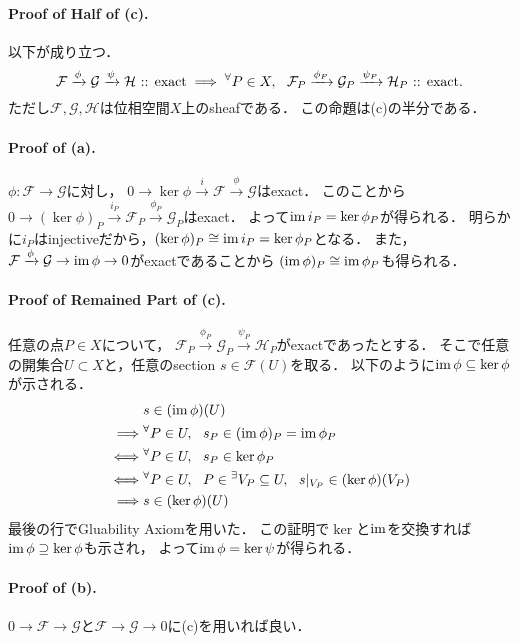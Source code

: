 \documentclass[a4paper]{jsarticle}
\newcommand{\shF}{\mathcal{F}}
\newcommand{\shG}{\mathcal{G}}
\newcommand{\shH}{\mathcal{H}}
\begin{document}
    \paragraph{Proof of Half of (c).}
    以下が成り立つ．
    \[
        \shF \xrightarrow{\phi} \shG \xrightarrow{\psi} \shH \text{ :: exact}
        \implies
        \Forall{P \in X}
        \shF_P \xrightarrow{\phi_P} \shG_P \xrightarrow{\psi_P} \shH_P \text{ :: exact}.
    \]
    ただし$\shF,\shG,\shH$は位相空間$X$上のsheafである．
    この命題は(c)の半分である．

    \paragraph{Proof of (a).}
    $\phi: \shF \to \shG$に対し，
    $0 \to \ker \phi \xrightarrow{i} \shF \xrightarrow{\phi} \shG$はexact．
    このことから
    $0 \to (\ker \phi)_P \xrightarrow{i_P} \shF_P \xrightarrow{\phi_P} \shG_P$はexact．
    よって$\operatorname{im} i_P=\ker \phi_P$が得られる．
    明らかに$i_P$はinjectiveだから，$(\ker \phi)_P \cong \operatorname{im} i_P=\ker \phi_P$となる．
    また，$\shF \xrightarrow{\phi} \shG \to \im \phi \to 0$がexactであることから
    $(\operatorname{im} \phi)_P \cong \operatorname{im} \phi_P$も得られる．

    \paragraph{Proof of Remained Part of (c).}
    任意の点$P \in X$について，
    $\shF_P \xrightarrow{\phi_P} \shG_P \xrightarrow{\psi_P} \shH_P$がexactであったとする．
    そこで任意の開集合$U \subset X$と，任意のsection $s \in \shF(U)$を取る．
    以下のように$\operatorname{im} \phi \subseteq \ker \phi$が示される．
    \begin{align*}
        {}&         s \in (\operatorname{im} \phi)(U) \\
        \implies&   {}^{\forall} P \in U,~~ s_P \in (\operatorname{im} \phi)_P=\operatorname{im} \phi_P \\
        \iff&       {}^{\forall} P \in U,~~ s_P \in \ker \phi_P \\
        \iff&       {}^{\forall} P \in U,~~ P \in {}^{\exists} V_P \subseteq U,~~ s|_{V_P} \in (\ker \phi)(V_P) \\
        \implies&   s \in (\ker \phi)(U)
    \end{align*}
    最後の行でGluability Axiomを用いた．
    この証明で$\ker$と$\operatorname{im}$を交換すれば$\operatorname{im} \phi \supseteq \ker \phi$も示され，
    よって$\operatorname{im} \phi=\ker \psi$が得られる．

    \paragraph{Proof of (b).}
    $0 \to \shF \to \shG$と$\shF \to \shG \to 0$に(c)を用いれば良い．
\end{document}
